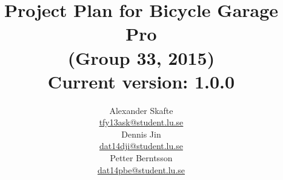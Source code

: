 \title{
	Project Plan for Bicycle Garage Pro\\
	(Group 33, 2015)\\
	\vspace{0.2in}
	\normalsize Current version: 1.0.0
}
\author{
	Alexander Skafte\\
	\url{tfy13ask@student.lu.se}\\
	Dennis Jin\\
	\url{dat14dji@student.lu.se}\\
	Petter Berntsson\\
	\url{dat14pbe@student.lu.se}\\
}
\date{}
